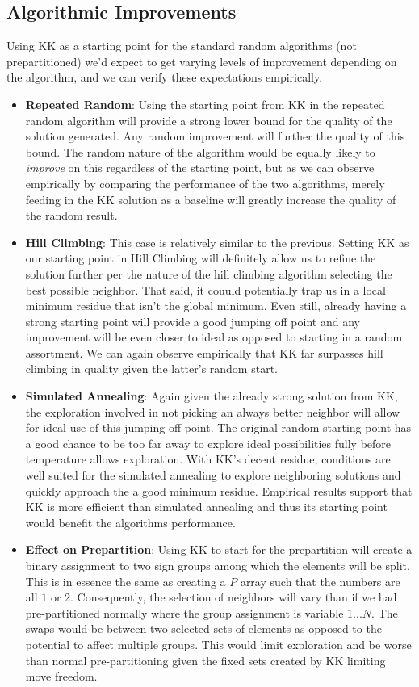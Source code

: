 \documentclass[11pt]{scrartcl}
\theoremstyle{dotlessP}
\theoremstyle{dotlessN}
\theoremstyle{dotN}
\begin{document}
\subsection{Algorithmic Improvements}
Using KK as a starting point for the standard random algorithms (not prepartitioned) we'd expect to get varying levels of improvement depending on the algorithm, and we can verify these expectations empirically.
\begin{itemize}
    \item \textbf{Repeated Random}: Using the starting point from KK in the repeated random algorithm will provide a strong lower bound for the quality of the solution generated. Any random improvement will further the quality of this bound. The random nature of the algorithm would be equally likely to \textit{improve} on this regardless of the starting point, but as we can observe empirically by comparing the performance of the two algorithms, merely feeding in the KK solution as a baseline will greatly increase the quality of the random result.
    \item  \textbf{Hill Climbing}: This case is relatively similar to the previous. Setting KK as our starting point in Hill Climbing will definitely allow us to refine the solution further per the nature of the hill climbing algorithm selecting the best possible neighbor. That said, it couuld potentially trap us in a local minimum residue that isn't the global minimum. Even still, already having a strong starting point will provide a good jumping off point and any improvement will be even closer to ideal as opposed to starting in a random assortment. We can again observe empirically that KK far surpasses hill climbing in quality given the latter's random start. 
    \item \textbf{Simulated Annealing}: Again given the already strong solution from KK, the exploration involved in not picking an always better neighbor will allow for ideal use of this jumping off point. The original random starting point has a good chance to be too far away to explore ideal possibilities fully before temperature allows exploration. With KK's decent residue, conditions are well suited for the simulated annealing to explore neighboring solutions and quickly approach the a good minimum residue. Empirical results support that KK is more efficient than simulated annealing and thus its starting point would benefit the algorithms performance. 
    \item \textbf{Effect on Prepartition}: Using KK to start for the prepartition will create a binary assignment to two sign groups among which the elements will be split. This is in essence the same as creating a $P$ array such that the numbers are all $1$ or $2$. Consequently, the selection of neighbors will vary than if we had pre-partitioned normally where the group assignment is variable $1...N$. The swaps would be between two selected sets of elements as opposed to the potential to affect multiple groups. This would limit exploration and be worse than normal pre-partitioning given the fixed sets created by KK limiting move freedom.\\


\end{itemize}
\end{document}
